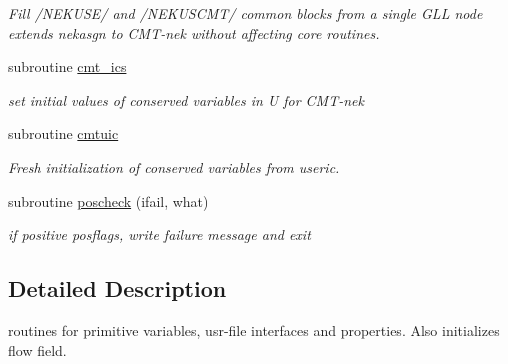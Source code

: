 \begin{DoxyCompactItemize}
\begin{DoxyCompactList}\small\item\em Fill /\-N\-E\-K\-U\-S\-E/ and /\-N\-E\-K\-U\-S\-C\-M\-T/ common blocks from a single G\-L\-L node extends nekasgn to C\-M\-T-\/nek without affecting core routines. \end{DoxyCompactList}\item 
subroutine \hyperlink{group__initialconds_ga1be8524b895b1b95b04e8707aa0ba4ae}{cmt\-\_\-ics}
\begin{DoxyCompactList}\small\item\em set initial values of conserved variables in U for C\-M\-T-\/nek \end{DoxyCompactList}\item 
subroutine \hyperlink{group__initialconds_ga3e2114ab9f0c76a032cd4d0f708bdc24}{cmtuic}
\begin{DoxyCompactList}\small\item\em Fresh initialization of conserved variables from useric. \end{DoxyCompactList}\item 
\hypertarget{group__state_ga9e9e837579897a93f40aae1fe6060255}{subroutine \hyperlink{group__state_ga9e9e837579897a93f40aae1fe6060255}{poscheck} (ifail, what)}\label{group__state_ga9e9e837579897a93f40aae1fe6060255}

\begin{DoxyCompactList}\small\item\em if positive posflags, write failure message and exit \end{DoxyCompactList}\end{DoxyCompactItemize}


\subsection{Detailed Description}
routines for primitive variables, usr-\/file interfaces and properties. Also initializes flow field. 